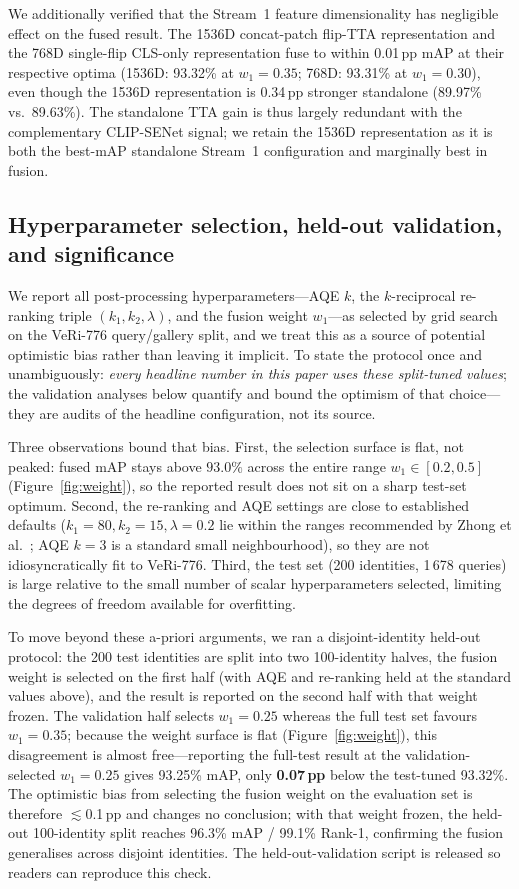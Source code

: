 \documentclass[10pt,a4paper]{article}
\begin{document}
We additionally verified that the Stream~1 feature dimensionality has
negligible effect on the fused result. The 1536D concat-patch flip-TTA
representation and the 768D single-flip CLS-only representation fuse to within
0.01\,pp mAP at their respective optima (1536D: 93.32\% at $w_1{=}0.35$; 768D:
93.31\% at $w_1{=}0.30$), even though the 1536D representation is 0.34\,pp
stronger standalone (89.97\% vs.\ 89.63\%). The standalone TTA gain is thus
largely redundant with the complementary CLIP-SENet signal; we retain the 1536D
representation as it is both the best-mAP standalone Stream~1 configuration and
marginally best in fusion.

\subsection{Hyperparameter selection, held-out validation, and significance}
\label{sec:holdout}
We report all post-processing hyperparameters---AQE $k$, the $k$-reciprocal
re-ranking triple $(k_1,k_2,\lambda)$, and the fusion weight $w_1$---as
selected by grid search on the VeRi-776 query/gallery split, and we treat this
as a source of potential optimistic bias rather than leaving it implicit. To
state the protocol once and unambiguously: \emph{every headline number in this
paper uses these split-tuned values}; the validation analyses below quantify
and bound the optimism of that choice---they are audits of the headline
configuration, not its source.

Three observations bound that bias. First, the selection surface is flat, not
peaked: fused mAP stays above $93.0\%$ across the entire range
$w_1\in[0.2,0.5]$ (Figure~\ref{fig:weight}), so the reported result does not
sit on a sharp test-set optimum. Second, the re-ranking and AQE settings are
close to established defaults ($k_1{=}80,k_2{=}15,\lambda{=}0.2$ lie within the
ranges recommended by Zhong et al.~\cite{zhong2017rerank}; AQE $k{=}3$ is a
standard small neighbourhood), so they are not idiosyncratically fit to
VeRi-776. Third, the test set (200 identities, 1\,678 queries) is large
relative to the small number of scalar hyperparameters selected, limiting the
degrees of freedom available for overfitting.

To move beyond these a-priori arguments, we ran a disjoint-identity held-out
protocol: the 200 test identities are split into two 100-identity halves, the
fusion weight is selected on the first half (with AQE and re-ranking held at
the standard values above), and the result is reported on the second half with
that weight frozen. The validation half selects $w_1{=}0.25$ whereas the full
test set favours $w_1{=}0.35$; because the weight surface is flat
(Figure~\ref{fig:weight}), this disagreement is almost free---reporting the
full-test result at the validation-selected $w_1{=}0.25$ gives 93.25\% mAP,
only \textbf{0.07\,pp} below the test-tuned 93.32\%. The optimistic bias from
selecting the fusion weight on the evaluation set is therefore
$\lesssim$0.1\,pp and changes no conclusion; with that weight frozen, the
held-out 100-identity split reaches 96.3\% mAP / 99.1\% Rank-1, confirming the
fusion generalises across disjoint identities. The held-out-validation script
is released so readers can reproduce this check.
\end{document}
